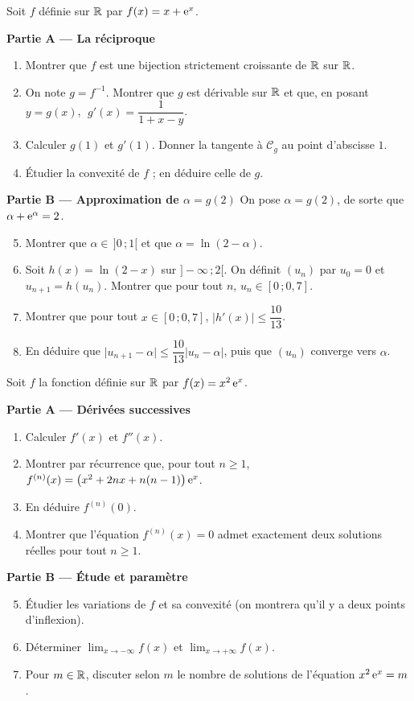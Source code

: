 Soit $f$ définie sur $\mathbb{R}$ par $f(x)=x+\mathrm{e}^{x}$.

\textbf{Partie A — La réciproque}
\begin{enumerate}
	\item Montrer que $f$ est une bijection strictement croissante de $\mathbb{R}$
	sur $\mathbb{R}$.
	\item On note $g=f^{-1}$. Montrer que $g$ est dérivable sur $\mathbb{R}$ et que,
	en posant $y=g(x)$, $\;g'(x)=\dfrac{1}{1+x-y}$.
	\item Calculer $g(1)$ et $g'(1)$. Donner la tangente à $\mathcal C_g$ au
	point d'abscisse $1$.
	\item Étudier la convexité de $f$ ; en déduire celle de $g$.
\end{enumerate}

\textbf{Partie B — Approximation de $\alpha=g(2)$}
On pose $\alpha=g(2)$, de sorte que $\alpha+\mathrm{e}^{\alpha}=2$.
\begin{enumerate}
	\setcounter{enumi}{4}
	\item Montrer que $\alpha\in\,]0\,;1[$ et que $\alpha=\ln(2-\alpha)$.
	\item Soit $h(x)=\ln(2-x)$ sur $]-\infty\,;2[$. On définit $(u_n)$ par
	$u_0=0$ et $u_{n+1}=h(u_n)$. Montrer que pour tout $n$,
	$u_n\in[0\,;0{,}7]$.
	\item Montrer que pour tout $x\in[0\,;0{,}7]$,
	$\bigl|h'(x)\bigr|\leq \dfrac{10}{13}$.
	\item En déduire que $\bigl|u_{n+1}-\alpha\bigr|\leq
	\dfrac{10}{13}\bigl|u_n-\alpha\bigr|$, puis que $(u_n)$ converge vers
	$\alpha$.
\end{enumerate}

Soit $f$ la fonction définie sur $\mathbb{R}$ par $f(x)=x^{2}\,\mathrm{e}^{x}$.

\textbf{Partie A — Dérivées successives}
\begin{enumerate}
	\item Calculer $f'(x)$ et $f''(x)$.
	\item Montrer par récurrence que, pour tout $n\geq 1$,
	$f^{(n)}(x)=\bigl(x^{2}+2nx+n(n-1)\bigr)\,\mathrm{e}^{x}$.
	\item En déduire $f^{(n)}(0)$.
	\item Montrer que l'équation $f^{(n)}(x)=0$ admet exactement deux
	solutions réelles pour tout $n\geq 1$.
\end{enumerate}

\textbf{Partie B — Étude et paramètre}
\begin{enumerate}
	\setcounter{enumi}{4}
	\item Étudier les variations de $f$ et sa convexité (on montrera qu'il y a
	deux points d'inflexion).
	\item Déterminer $\displaystyle\lim_{x\to-\infty}f(x)$ et
	$\displaystyle\lim_{x\to+\infty}f(x)$.
	\item Pour $m\in\mathbb{R}$, discuter selon $m$ le nombre de solutions de
	l'équation $x^{2}\,\mathrm{e}^{x}=m$.
\end{enumerate}
